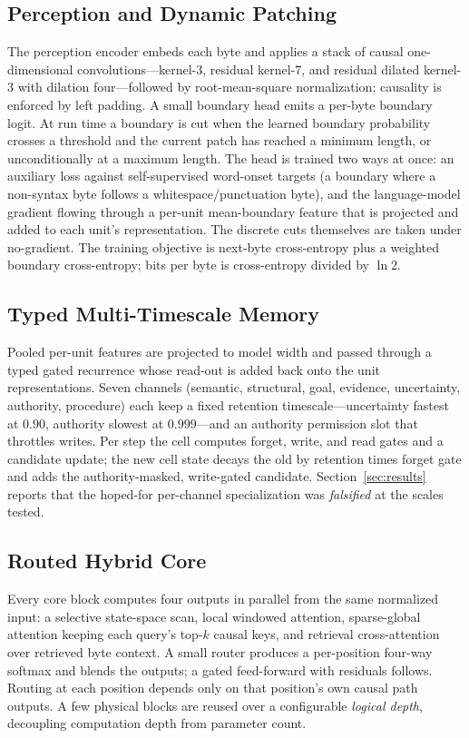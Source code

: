 \documentclass[journal]{IEEEtran}
\begin{document}
\subsection{Perception and Dynamic Patching}
The perception encoder embeds each byte and applies a stack of causal one-dimensional convolutions---kernel-3, residual kernel-7, and residual dilated kernel-3 with dilation four---followed by root-mean-square normalization; causality is enforced by left padding. A small boundary head emits a per-byte boundary logit. At run time a boundary is cut when the learned boundary probability crosses a threshold and the current patch has reached a minimum length, or unconditionally at a maximum length. The head is trained two ways at once: an auxiliary loss against self-supervised word-onset targets (a boundary where a non-syntax byte follows a whitespace/punctuation byte), and the language-model gradient flowing through a per-unit mean-boundary feature that is projected and added to each unit's representation. The discrete cuts themselves are taken under no-gradient. The training objective is next-byte cross-entropy plus a weighted boundary cross-entropy; bits per byte is cross-entropy divided by $\ln 2$.

\subsection{Typed Multi-Timescale Memory}
Pooled per-unit features are projected to model width and passed through a typed gated recurrence whose read-out is added back onto the unit representations. Seven channels (semantic, structural, goal, evidence, uncertainty, authority, procedure) each keep a fixed retention timescale---uncertainty fastest at $0.90$, authority slowest at $0.999$---and an authority permission slot that throttles writes. Per step the cell computes forget, write, and read gates and a candidate update; the new cell state decays the old by retention times forget gate and adds the authority-masked, write-gated candidate. Section~\ref{sec:results} reports that the hoped-for per-channel specialization was \emph{falsified} at the scales tested.

\subsection{Routed Hybrid Core}
Every core block computes four outputs in parallel from the same normalized input: a selective state-space scan, local windowed attention, sparse-global attention keeping each query's top-$k$ causal keys, and retrieval cross-attention over retrieved byte context. A small router produces a per-position four-way softmax and blends the outputs; a gated feed-forward with residuals follows. Routing at each position depends only on that position's own causal path outputs. A few physical blocks are reused over a configurable \emph{logical depth}, decoupling computation depth from parameter count.
\end{document}
